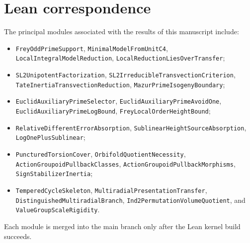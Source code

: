\documentclass[11pt]{article}
\begin{document}
\section*{Lean correspondence}
The principal modules associated with the results of this manuscript include:
\begin{itemize}
\item \texttt{FreyOddPrimeSupport},
  \texttt{MinimalModelFromUnitC4},
  \texttt{LocalIntegralModelReduction},
  \texttt{LocalReductionLiesOverTransfer};
\item \texttt{SL2UnipotentFactorization},
  \texttt{SL2IrreducibleTransvectionCriterion},
  \texttt{TateInertiaTransvectionReduction},
  \texttt{MazurPrimeIsogenyBoundary};
\item \texttt{EuclidAuxiliaryPrimeSelector},
  \texttt{EuclidAuxiliaryPrimeAvoidOne},
  \texttt{EuclidAuxiliaryPrimeLogBound},
  \texttt{FreyLocalOrderHeightBound};
\item \texttt{RelativeDifferentErrorAbsorption},
  \texttt{SublinearHeightSourceAbsorption},
  \texttt{LogOnePlusSublinear};
\item \texttt{PuncturedTorsionCover},
  \texttt{OrbifoldQuotientNecessity},
  \texttt{ActionGroupoidPullbackClasses},
  \texttt{ActionGroupoidPullbackMorphisms},
  \texttt{SignStabilizerInertia};
\item \texttt{TemperedCycleSkeleton},
  \texttt{MultiradialPresentationTransfer},
  \texttt{DistinguishedMultiradialBranch},
  \texttt{Ind2PermutationVolumeQuotient}, and
  \texttt{ValueGroupScaleRigidity}.
\end{itemize}
Each module is merged into the main branch only after the Lean kernel build
succeeds.
\end{document}
